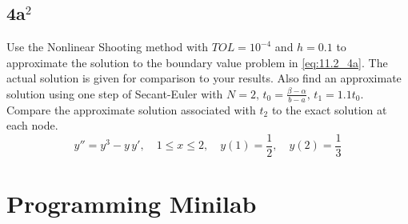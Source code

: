 \documentclass[12pt]{article}
\begin{document}
\subsection{4a$^2$}
Use the Nonlinear Shooting method with $TOL=10^{-4}$ and $h=0.1$ to
approximate the solution to the boundary value problem in
\cref{eq:11.2_4a}.  The actual solution is given for comparison to
your results. Also find an approximate solution using one step of
Secant-Euler with
$N=2,\,t_0=\frac{\beta-\alpha}{b-a},\,t_1=1.1t_0$. Compare the
approximate solution associated with $t_2$ to the exact solution at
each node.
\begin{equation}
  \label{eq:11.2_4a}
  y''=y^3-y\,y',\quad 1\leq x\leq 2,\quad y(1)=\frac{1}{2},\quad 
  y(2)=\frac{1}{3}
\end{equation}

\section{Programming Minilab}
\end{document}
